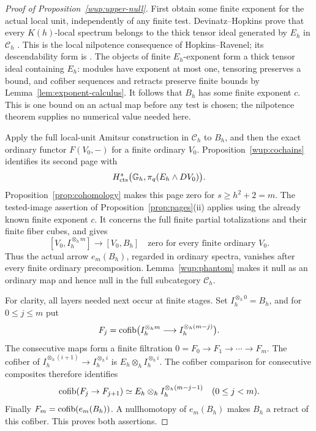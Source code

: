 \begin{proof}[Proof of Proposition~\ref{wup:upper-null}]
First obtain some finite exponent for the actual local unit,
independently of any finite test. Devinatz--Hopkins prove that
every \(K(h)\)-local spectrum belongs to the thick tensor ideal
generated by \(E_h\) in \(\mathcal C_h\)
\cite[Appendix~A, Proposition~A.3]{dh2004}. This is the local
nilpotence consequence of Hopkins--Ravenel; its descendability
form is \cite[Proposition~10.10]{mathew2016}. The objects of finite
\(E_h\)-exponent form a thick tensor ideal containing \(E_h\):
modules have exponent at most one, tensoring preserves a bound,
and cofiber sequences and retracts preserve finite bounds by
Lemma~\ref{lem:exponent-calculus}. It follows that \(B_h\) has
some finite exponent \(c\). This is one bound on an actual map
before any test is chosen; the nilpotence theorem supplies no
numerical value needed here.

Apply the full local-unit Amitsur construction in \(\mathcal C_h\)
to \(B_h\), and then the exact ordinary functor \(F(V_0,-)\) for a
finite ordinary \(V_0\). Proposition~\ref{wup:cochains} identifies
its second page with
\[
 H^s_{\operatorname{cts}}\bigl(\mathbb G_h,\pi_q(E_h\wedge D V_0)\bigr).
\]
Proposition~\ref{prop:cohomology} makes this page zero for
\(s\geq h^2+2=m\). The tested-image assertion of
Proposition~\ref{prop:pages}(ii) applies using the already known
finite exponent \(c\). It concerns the full finite partial
totalizations and their finite fiber cubes, and gives
\[
 [V_0,I_h^{\otimes_h m}]\longrightarrow[V_0,B_h]
       \quad\text{zero for every finite ordinary }V_0.
\]
Thus the actual arrow \(e_m(B_h)\), regarded in ordinary spectra,
vanishes after every finite ordinary precomposition.
Lemma~\ref{wup:phantom} makes it null as an ordinary map and
hence null in the full subcategory \(\mathcal C_h\).

For clarity, all layers needed next occur at finite stages. Set
\(I_h^{\otimes_h0}=B_h\), and for \(0\leq j\leq m\) put
\[
 F_j=\operatorname{cofib}\bigl(
 I_h^{\otimes_h m}\longrightarrow I_h^{\otimes_h(m-j)}
 \bigr).
\]
The consecutive maps form a finite filtration
\(0=F_0\to F_1\to\cdots\to F_m\).
The cofiber of \(I_h^{\otimes_h(i+1)}\to I_h^{\otimes_h i}\)
is \(E_h\otimes_h I_h^{\otimes_h i}\). The cofiber comparison
for consecutive composites therefore identifies
\[
 \operatorname{cofib}(F_j\to F_{j+1})
 \simeq E_h\otimes_h I_h^{\otimes_h(m-j-1)}
       \quad(0\leq j<m).
\]
Finally \(F_m=\operatorname{cofib}(e_m(B_h))\). A nullhomotopy of \(e_m(B_h)\)
makes \(B_h\) a retract of this cofiber. This proves both assertions.
\end{proof}
